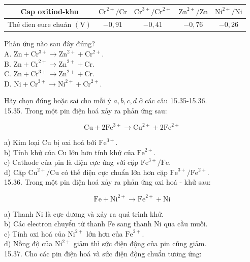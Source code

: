 \documentclass[10pt]{article}
\begin{document}
\begin{center}
\begin{tabular}{|c|c|c|c|c|}
\hline
Cap oxitiod-khu & $\mathrm{Cr}^{2+} / \mathrm{Cr}$ & $\mathrm{Cr}^{3+} / \mathrm{Cr}^{2+}$ & $\mathrm{Zn}^{2+} / \mathrm{Zn}$ & $\mathrm{Ni}^{2+} / \mathrm{Ni}$ \\
\hline
Thé dien eure chuán $(\mathrm{V})$ & $-0,91$ & $-0,41$ & $-0,76$ & $-0,26$ \\
\hline
\end{tabular}
\end{center}

Phản ứng nào sau đây đúng?\\
A. $\mathrm{Zn}+\mathrm{Cr}^{3+} \longrightarrow \mathrm{Zn}^{2+}+\mathrm{Cr}^{2+}$.\\
B. $\mathrm{Zn}+\mathrm{Cr}^{2+} \longrightarrow \mathrm{Zn}^{2+}+\mathrm{Cr}$.\\
C. $\mathrm{Zn}+\mathrm{Cr}^{3+} \longrightarrow \mathrm{Zn}^{2+}+\mathrm{Cr}$.\\
D. $\mathrm{Ni}+\mathrm{Cr}^{3+} \longrightarrow \mathrm{Ni}^{2+}+\mathrm{Cr}^{2+}$.

Hãy chọn đúng hoặc sai cho mỗi ý $a, b, c, d$ ở các câu 15.35-15.36.\\
15.35. Trong một pin điện hoá xảy ra phản ứng sau:

$$
\mathrm{Cu}+2 \mathrm{Fe}^{3+} \longrightarrow \mathrm{Cu}^{2+}+2 \mathrm{Fe}^{2+}
$$

a) Kim loại Cu bị oxi hoá bởi $\mathrm{Fe}^{3+}$.\\
b) Tính khử của Cu lớn hơn tính khử của $\mathrm{Fe}^{2+}$.\\
c) Cathode của pin là điện cực ứng với cặp $\mathrm{Fe}^{3+} / \mathrm{Fe}$.\\
d) Cặp $\mathrm{Cu}^{2+} / \mathrm{Cu}$ có thế điện cực chuẩn lớn hơn cặp $\mathrm{Fe}^{3+} / \mathrm{Fe}^{2+}$.\\
15.36. Trong một pin điện hoá xảy ra phản ứng oxi hoá - khử sau:

$$
\mathrm{Fe}+\mathrm{Ni}^{2+} \longrightarrow \mathrm{Fe}^{2+}+\mathrm{Ni}
$$

a) Thanh Ni là cực dương và xảy ra quá trình khử.\\
b) Các electron chuyển từ thanh Fe sang thanh Ni qua cầu muối.\\
c) Tính oxi hoá của $\mathrm{Ni}^{2+}$ lớn hơn của $\mathrm{Fe}^{2+}$.\\
d) Nồng độ của $\mathrm{Ni}^{2+}$ giảm thì sức điện động của pin cũng giảm.\\
15.37. Cho các pin điện hoá và sức điện động chuẩn tương ứng:
\end{document}
